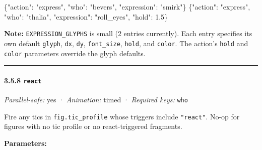 \documentclass[
  11pt,
]{book}
\newenvironment{Shaded}{}{}
\newcommand{\DataTypeTok}[1]{\textcolor[rgb]{0.56,0.13,0.00}{#1}}
\newcommand{\FloatTok}[1]{\textcolor[rgb]{0.25,0.63,0.44}{#1}}
\newcommand{\FunctionTok}[1]{\textcolor[rgb]{0.02,0.16,0.49}{#1}}
\newcommand{\StringTok}[1]{\textcolor[rgb]{0.25,0.44,0.63}{#1}}
\begin{document}
\begin{Shaded}
\begin{Highlighting}[]
\FunctionTok{\{}\DataTypeTok{"action"}\FunctionTok{:} \StringTok{"express"}\FunctionTok{,} \DataTypeTok{"who"}\FunctionTok{:} \StringTok{"bevers"}\FunctionTok{,} \DataTypeTok{"expression"}\FunctionTok{:} \StringTok{"smirk"}\FunctionTok{\}}
\FunctionTok{\{}\DataTypeTok{"action"}\FunctionTok{:} \StringTok{"express"}\FunctionTok{,} \DataTypeTok{"who"}\FunctionTok{:} \StringTok{"thalia"}\FunctionTok{,} \DataTypeTok{"expression"}\FunctionTok{:} \StringTok{"roll\_eyes"}\FunctionTok{,} \DataTypeTok{"hold"}\FunctionTok{:} \FloatTok{1.5}\FunctionTok{\}}
\end{Highlighting}
\end{Shaded}

\textbf{Note:} \texttt{EXPRESSION\_GLYPHS} is small (2 entries
currently). Each entry specifies its own default \texttt{glyph},
\texttt{dx}, \texttt{dy}, \texttt{font\_size}, \texttt{hold}, and
\texttt{color}. The action's \texttt{hold} and \texttt{color} parameters
override the glyph defaults.

\begin{center}\rule{0.5\linewidth}{0.5pt}\end{center}

\paragraph{\texorpdfstring{3.5.8
\texttt{react}}{3.5.8 react}}\label{react}

\emph{Parallel-safe:} yes · \emph{Animation:} timed · \emph{Required
keys:} \texttt{who}

Fire any tics in \texttt{fig.tic\_profile} whose triggers include
\texttt{"react"}. No-op for figures with no tic profile or no
react-triggered fragments.

\textbf{Parameters:}
\end{document}
